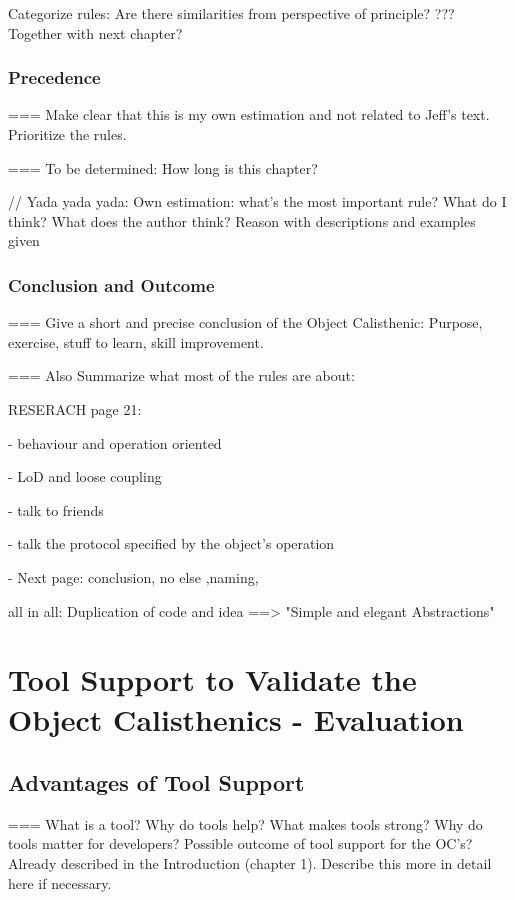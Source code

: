 Categorize rules: Are there similarities from perspective of principle? ??? Together with next chapter?

\subsection*{Precedence}
=== Make clear that this is my own estimation and not related to Jeff's text. Prioritize the rules. 

=== To be determined: How long is this chapter?

\begin{itshape}
// Yada yada yada: 
Own estimation: what's the most important rule? 
What do I think?
What does the author think? 
Reason with descriptions and examples given
\end{itshape}

\subsection*{Conclusion and Outcome}
=== Give a short and precise conclusion of the Object Calisthenic: Purpose, exercise, stuff to learn, skill improvement. 

=== Also Summarize what most of the rules are about: 

RESERACH page 21: 

- behaviour and operation oriented

- LoD and loose coupling

- talk to friends

- talk the protocol specified by the object's operation

- Next page: conclusion, no else ,naming, 

all in all: Duplication of code and idea
==> "Simple and elegant Abstractions"


\chapter{Tool Support to Validate the Object Calisthenics - Evaluation}
\label{Evaluation}
\section{Advantages of Tool Support}
\label{e:advantages}
=== What is a tool? Why do tools help? What makes tools strong? Why do tools matter for developers?
Possible outcome of tool support for the OC's? Already described in the Introduction (chapter 1). Describe this more in detail here if necessary. 
